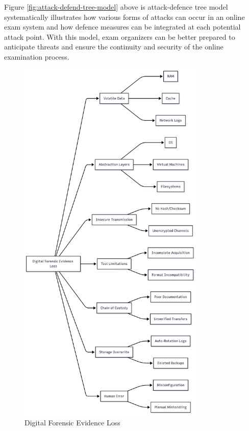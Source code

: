 Figure \ref{fig:attack-defend-tree-model} above \citet{rosmansyah2019attackdefensetreeonaeexamsystem} is attack-defence tree model systematically illustrates how various forms of attacks can occur in an online exam system and how defence measures can be integrated at each potential attack point. With this model, exam organizers can be better prepared to anticipate threats and ensure the continuity and security of the online examination process.
\begin{figure}[H] 
	\centering
	\includegraphics[height=18cm]{figure/df-evidence-loss.png}
	\caption{Digital Forensic Evidence Loss \cite{larchenko2025mindmap}}
	\label{fig:df-evidence-loss}
\end{figure}


